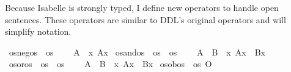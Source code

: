 \begin{isabellebody}
\begin{isamarkuptext}
Because Isabelle is strongly typed, I define new operators to handle open sentences. These operators 
are similar to DDL's original operators and will simplify notation.%
\end{isamarkuptext}\isamarkuptrue%
\isamarkupfalse%
\ os{\isacharunderscore}neg{\isacharcolon}{\isacharcolon}{\isachardoublequoteopen}os\ {\isasymRightarrow}\ os{\isachardoublequoteclose}\ {\isacharparenleft}{\isachardoublequoteopen}\isactrlemph {\isasymnot}{\isacharunderscore}{\isachardoublequoteclose}{\isacharparenright}\isanewline
\ \ \ {\isachardoublequoteopen}{\isacharparenleft}\isactrlemph {\isasymnot}A{\isacharparenright}\ {\isasymequiv}\ {\isasymlambda}x{\isachardot}\ \isactrlbold {\isasymnot}{\isacharparenleft}A{\isacharparenleft}x{\isacharparenright}{\isacharparenright}{\isachardoublequoteclose}\isanewline
{}\isamarkupfalse%
\ os{\isacharunderscore}and{\isacharcolon}{\isacharcolon}{\isachardoublequoteopen}os\ {\isasymRightarrow}\ os\ {\isasymRightarrow}\ os{\isachardoublequoteclose}\ {\isacharparenleft}{\isachardoublequoteopen}{\isacharunderscore}\isactrlemph {\isasymand}{\isacharunderscore}{\isachardoublequoteclose}{\isacharparenright}\isanewline
\ \ \ {\isachardoublequoteopen}{\isacharparenleft}A\ \isactrlemph {\isasymand}\ B{\isacharparenright}\ {\isasymequiv}\ {\isasymlambda}x{\isachardot}\ {\isacharparenleft}{\isacharparenleft}A{\isacharparenleft}x{\isacharparenright}{\isacharparenright}\ \isactrlbold {\isasymand}\ {\isacharparenleft}B{\isacharparenleft}x{\isacharparenright}{\isacharparenright}{\isacharparenright}{\isachardoublequoteclose}\isanewline
{}\isamarkupfalse%
\ os{\isacharunderscore}or{\isacharcolon}{\isacharcolon}{\isachardoublequoteopen}os\ {\isasymRightarrow}\ os\ {\isasymRightarrow}\ os{\isachardoublequoteclose}\ {\isacharparenleft}{\isachardoublequoteopen}{\isacharunderscore}\isactrlemph {\isasymor}{\isacharunderscore}{\isachardoublequoteclose}{\isacharparenright}\isanewline
\ \ \ {\isachardoublequoteopen}{\isacharparenleft}A\ \isactrlemph {\isasymor}\ B{\isacharparenright}\ {\isasymequiv}\ {\isasymlambda}x{\isachardot}\ {\isacharparenleft}{\isacharparenleft}A{\isacharparenleft}x{\isacharparenright}{\isacharparenright}\ \isactrlbold {\isasymor}\ {\isacharparenleft}B{\isacharparenleft}x{\isacharparenright}{\isacharparenright}{\isacharparenright}{\isachardoublequoteclose}\isanewline
{}\isamarkupfalse%
\ os{\isacharunderscore}ob{\isacharcolon}{\isacharcolon}{\isachardoublequoteopen}os\ {\isasymRightarrow}\ os{\isachardoublequoteclose}\ {\isacharparenleft}{\isachardoublequoteopen}\isactrlemph O{\isacharbraceleft}{\isacharunderscore}{\isacharbraceright}{\isachardoublequoteclose}{\isacharparenright}\isanewline

\end{isabellebody}
